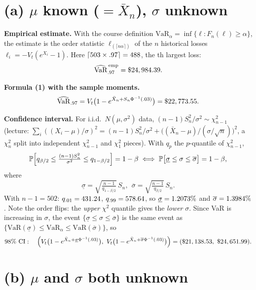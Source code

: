 \documentclass[12pt]{article}
\newcommand{\PP}{\mathbb{P}}
\newcommand{\VaR}{\mathrm{VaR}}
\newcommand{\1}{\mathbf{1}}
\theoremstyle{remark}
\begin{document}
\section*{(a) $\mu$ known ($=\bar X_n$), $\sigma$ unknown}

\textbf{Empirical estimate.} With the course definition $\VaR_\alpha=\inf\{\ell:F_n(\ell)\ge\alpha\}$,
the estimate is the order statistic $\ell_{(\lceil n\alpha\rceil)}$ of the $n$ historical losses
$\ell_i=-V_t(e^{X_i}-1)$. Here $\lceil503\times.97\rceil=488$, the \EmpRank th largest loss:
\[
\widehat{\VaR}^{\,\mathrm{emp}}_{.97}=\$\VarEmp .
\]

\textbf{Formula (1) with the sample moments.}
\[
\widehat{\VaR}_{.97}=V_t\bigl(1-e^{\bar X_n+S_n\Phi^{-1}(.03)}\bigr)=\$\VarPt .
\]

\textbf{Confidence interval.} For i.i.d.\ $N(\mu,\sigma^2)$ data, $(n-1)S_n^2/\sigma^2\sim\chi^2_{n-1}$
(lecture: $\sum_i((X_i-\mu)/\sigma)^2=(n-1)S_n^2/\sigma^2+\bigl((\bar X_n-\mu)/(\sigma/\sqrt n)\bigr)^2$,
a $\chi^2_n$ split into independent $\chi^2_{n-1}$ and $\chi^2_1$ pieces). With $q_p$ the $p$-quantile of
$\chi^2_{n-1}$,
\[
\PP\Bigl[q_{\beta/2}\le\tfrac{(n-1)S_n^2}{\sigma^2}\le q_{1-\beta/2}\Bigr]=1-\beta
\iff
\PP\bigl[\underline\sigma\le\sigma\le\overline\sigma\bigr]=1-\beta,
\]
where
\[
\underline\sigma=\sqrt{\tfrac{n-1}{q_{1-\beta/2}}}\,S_n,\ \
\overline\sigma=\sqrt{\tfrac{n-1}{q_{\beta/2}}}\,S_n .
\]
With $n-1=502$: $q_{.01}=431.24$, $q_{.99}=578.64$, so $\underline\sigma=1.2073\%$ and
$\overline\sigma=1.3984\%$. Note the order flips: the \emph{upper} $\chi^2$ quantile gives the
\emph{lower} $\sigma$. Since VaR is increasing in $\sigma$, the event $\{\underline\sigma\le\sigma\le\overline\sigma\}$
is the same event as $\{\VaR(\underline\sigma)\le\VaR_\alpha\le\VaR(\overline\sigma)\}$, so
\[
98\%\ \text{CI}:\quad
\Bigl(V_t\bigl(1-e^{\bar X_n+\underline\sigma\Phi^{-1}(.03)}\bigr),\ V_t\bigl(1-e^{\bar X_n+\overline\sigma\Phi^{-1}(.03)}\bigr)\Bigr)
=(\$21,138.53,\ \$24,651.99).
\]

\section*{(b) $\mu$ and $\sigma$ both unknown}
\end{document}
